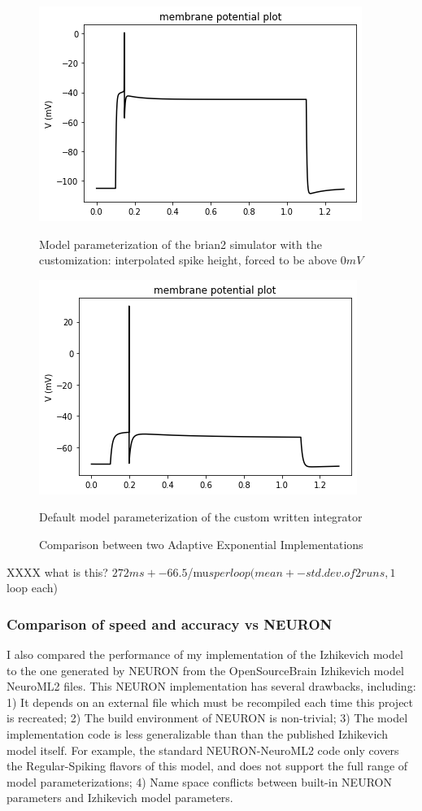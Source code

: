 \begin{figure}
\begin{center}
\centering
  \centering
\includegraphics[scale=0.45]{figures/backend_check_files/backend_check_12_10}
\caption{Model parameterization of the brian2 simulator with the customization: interpolated spike height, forced to be above $0mV$}

  \label{fig:sub1}
  \centering
  \includegraphics[scale=0.45]{figures/backend_check_files/backend_check_4_2}
    \caption{Default model parameterization of the custom written integrator}
  \label{fig:sub2}
\caption{Comparison between two Adaptive Exponential Implementations}
\label{fig:test}
\end{center}
\end{figure}

XXXX what is this?
$272 ms +- 66.5 $/mu$s per loop (mean +- std. dev. of 2 runs, 1$ loop each)

\subsubsection{Comparison of speed and accuracy vs NEURON}
I also compared the performance of my implementation of the Izhikevich model to the one generated by NEURON from the OpenSourceBrain Izhikevich model NeuroML2 files.
This NEURON implementation has several drawbacks, including: 1) It depends on an external file which must be recompiled each time this project is recreated; 2) The build environment of NEURON is non-trivial; 3) The model implementation code is less generalizable than than the published Izhikevich model itself. For example, the standard NEURON-NeuroML2 code only covers the Regular-Spiking flavors of this model, and does not support the full range of model parameterizations; 4) Name space conflicts between built-in NEURON parameters and Izhikevich model parameters.  

